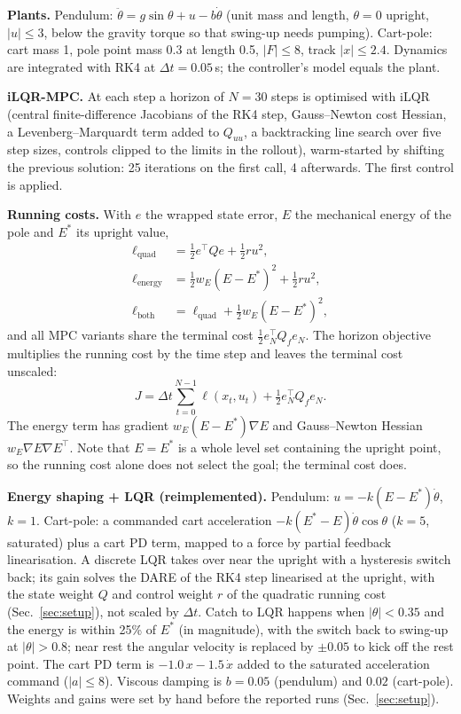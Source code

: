 \textbf{Plants.} Pendulum: $\ddot\theta = g\sin\theta + u - b\dot\theta$ (unit mass and length, $\theta=0$ upright, $|u|\le 3$, below the gravity torque so that swing-up needs pumping). Cart-pole: cart mass 1, pole point mass 0.3 at length 0.5, $|F|\le 8$, track $|x|\le 2.4$. Dynamics are integrated with RK4 at $\Delta t=0.05$\,s; the controller's model equals the plant.

\textbf{iLQR-MPC.} At each step a horizon of $N=30$ steps is optimised with iLQR (central finite-difference Jacobians of the RK4 step, Gauss--Newton cost Hessian, a Levenberg--Marquardt term added to $Q_{uu}$, a backtracking line search over five step sizes, controls clipped to the limits in the rollout), warm-started by shifting the previous solution: 25 iterations on the first call, 4 afterwards. The first control is applied.

\textbf{Running costs.} With $e$ the wrapped state error, $E$ the mechanical energy of the pole and $E^{*}$ its upright value,
\begin{align}
\ell_{\text{quad}} &= \tfrac12 e^\top Q e + \tfrac12 r u^2,\\
\ell_{\text{energy}} &= \tfrac12 w_E (E-E^{*})^2 + \tfrac12 r u^2,\\
\ell_{\text{both}} &= \ell_{\text{quad}} + \tfrac12 w_E (E-E^{*})^2 ,
\end{align}
and all MPC variants share the terminal cost $\tfrac12 e_N^\top Q_f e_N$. The horizon objective multiplies the running cost by the time step and leaves the terminal cost unscaled:
\begin{equation}
J=\Delta t\sum_{t=0}^{N-1}\ell(x_t,u_t)+\tfrac12 e_N^\top Q_f e_N .
\end{equation} The energy term has gradient $w_E (E-E^{*})\nabla E$ and Gauss--Newton Hessian $w_E \nabla E\nabla E^\top$. Note that $E=E^{*}$ is a whole level set containing the upright point, so the running cost alone does not select the goal; the terminal cost does.

\textbf{Energy shaping + LQR (reimplemented).} Pendulum: $u=-k(E-E^{*})\dot\theta$, $k=1$. Cart-pole: a commanded cart acceleration $-k(E^{*}-E)\dot\theta\cos\theta$ ($k=5$, saturated) plus a cart PD term, mapped to a force by partial feedback linearisation. A discrete LQR takes over near the upright with a hysteresis switch back; its gain solves the DARE of the RK4 step linearised at the upright, with the state weight $Q$ and control weight $r$ of the quadratic running cost (Sec.~\ref{sec:setup}), not scaled by $\Delta t$. Catch to LQR happens when $|\theta|<0.35$ and the energy is within 25\% of $E^{*}$ (in magnitude), with the switch back to swing-up at $|\theta|>0.8$; near rest the angular velocity is replaced by $\pm0.05$ to kick off the rest point. The cart PD term is $-1.0\,x-1.5\,\dot x$ added to the saturated acceleration command ($|a|\le 8$). Viscous damping is $b=0.05$ (pendulum) and $0.02$ (cart-pole). Weights and gains were set by hand before the reported runs (Sec.~\ref{sec:setup}).
